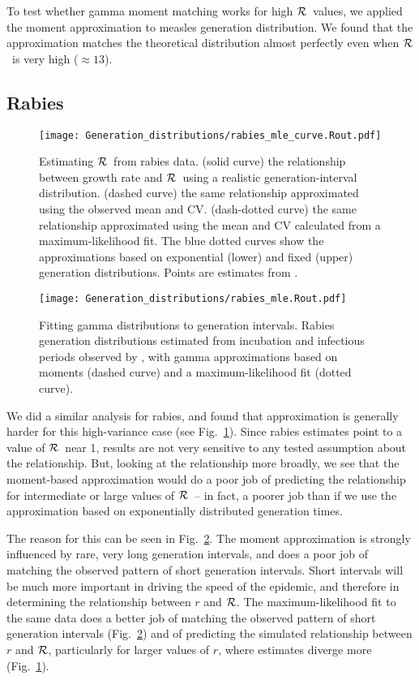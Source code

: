 \documentclass[12pt,]{article}
\newcommand{\RR}{\ensuremath{{\cal R}}}
\newcommand{\fref}[1]{Fig.~\ref{fig:#1}}
\begin{document}
To test whether gamma moment matching works for high \RR\ values, we applied the moment approximation to measles generation distribution. We found that the approximation matches the theoretical distribution almost perfectly even when \RR\ is very high ($\approx 13$).

\subsection{Rabies}

\begin{figure}[htbp] \centering
	\texttt{[image: Generation\_distributions/rabies\_mle\_curve.Rout.pdf]}
	\caption{Estimating \RR~from rabies data.
		(solid curve) the relationship between growth rate and \RR~using a realistic generation-interval distribution.
		(dashed curve) the same relationship approximated using the observed mean and CV.
		(dash-dotted curve) the same relationship approximated using the mean and CV calculated from a maximum-likelihood fit.
		The blue dotted curves show the approximations based on exponential (lower) and fixed (upper) generation distributions.
		Points are estimates from \cite{HampDush09}.
	}
	\label{fig:rabiesCurve}
\end{figure}

\begin{figure}[htbp] \centering
	\texttt{[image: Generation\_distributions/rabies\_mle.Rout.pdf]}
	\caption{
		Fitting gamma distributions to generation intervals. 
		Rabies generation distributions estimated from incubation and infectious periods observed by \cite{HampDush09}, with gamma approximations based on moments (dashed curve) and a maximum-likelihood fit (dotted curve).
	}
	\label{fig:rabiesHist}
\end{figure}

We did a similar analysis for rabies, and found that approximation is generally harder for this high-variance case (see \fref{rabiesCurve}). Since rabies estimates point to a value of \RR\ near 1, results are not very sensitive to any tested assumption about the relationship. But, looking at the relationship more broadly, we see that the moment-based approximation would do a poor job of predicting the relationship for intermediate or large values of \RR\ -- in fact, a poorer job than if we use the approximation based on exponentially distributed generation times. 

The reason for this can be seen in \fref{rabiesHist}. The moment approximation is strongly influenced by rare, very long generation intervals, and does a poor job of matching the observed pattern of short generation intervals. Short intervals will be much more important in driving the speed of the epidemic, and therefore in determining the relationship between $r$ and \RR. The maximum-likelihood fit to the same data does a better job of matching the observed pattern of short generation intervals (\fref{rabiesHist}) and of predicting the simulated relationship between $r$ and \RR, particularly for larger values of $r$, where estimates diverge more (\fref{rabiesCurve}).
\end{document}
